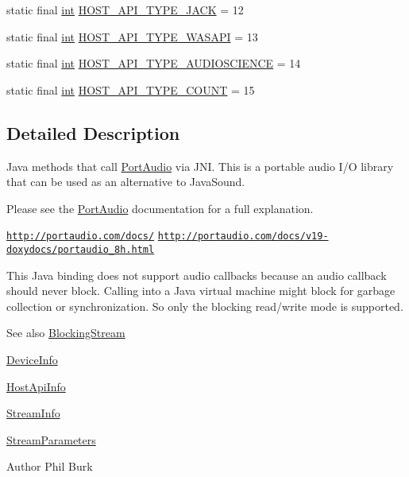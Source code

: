 \begin{DoxyCompactItemize}
\item 
static final \hyperlink{xmltok_8h_a5a0d4a5641ce434f1d23533f2b2e6653}{int} \hyperlink{classcom_1_1portaudio_1_1_port_audio_a883a151e9c2fa3df4bc2a246441dcf65}{H\+O\+S\+T\+\_\+\+A\+P\+I\+\_\+\+T\+Y\+P\+E\+\_\+\+J\+A\+CK} = 12
\item 
static final \hyperlink{xmltok_8h_a5a0d4a5641ce434f1d23533f2b2e6653}{int} \hyperlink{classcom_1_1portaudio_1_1_port_audio_a878906a801ec0974c8379defcbb1a45f}{H\+O\+S\+T\+\_\+\+A\+P\+I\+\_\+\+T\+Y\+P\+E\+\_\+\+W\+A\+S\+A\+PI} = 13
\item 
static final \hyperlink{xmltok_8h_a5a0d4a5641ce434f1d23533f2b2e6653}{int} \hyperlink{classcom_1_1portaudio_1_1_port_audio_ad72258e139b9133a8f20723e8aefa184}{H\+O\+S\+T\+\_\+\+A\+P\+I\+\_\+\+T\+Y\+P\+E\+\_\+\+A\+U\+D\+I\+O\+S\+C\+I\+E\+N\+CE} = 14
\item 
static final \hyperlink{xmltok_8h_a5a0d4a5641ce434f1d23533f2b2e6653}{int} \hyperlink{classcom_1_1portaudio_1_1_port_audio_ab2432d2945896284335ab4adcf4b9ddf}{H\+O\+S\+T\+\_\+\+A\+P\+I\+\_\+\+T\+Y\+P\+E\+\_\+\+C\+O\+U\+NT} = 15
\end{DoxyCompactItemize}


\subsection{Detailed Description}
Java methods that call \hyperlink{classcom_1_1portaudio_1_1_port_audio}{Port\+Audio} via J\+NI. This is a portable audio I/O library that can be used as an alternative to Java\+Sound.

Please see the \hyperlink{classcom_1_1portaudio_1_1_port_audio}{Port\+Audio} documentation for a full explanation.

\href{http://portaudio.com/docs/}{\tt http\+://portaudio.\+com/docs/} \href{http://portaudio.com/docs/v19-doxydocs/portaudio_8h.html}{\tt http\+://portaudio.\+com/docs/v19-\/doxydocs/portaudio\+\_\+8h.\+html}

This Java binding does not support audio callbacks because an audio callback should never block. Calling into a Java virtual machine might block for garbage collection or synchronization. So only the blocking read/write mode is supported.

\begin{DoxySeeAlso}{See also}
\hyperlink{classcom_1_1portaudio_1_1_blocking_stream}{Blocking\+Stream} 

\hyperlink{classcom_1_1portaudio_1_1_device_info}{Device\+Info} 

\hyperlink{classcom_1_1portaudio_1_1_host_api_info}{Host\+Api\+Info} 

\hyperlink{classcom_1_1portaudio_1_1_stream_info}{Stream\+Info} 

\hyperlink{classcom_1_1portaudio_1_1_stream_parameters}{Stream\+Parameters}
\end{DoxySeeAlso}
\begin{DoxyAuthor}{Author}
Phil Burk 
\end{DoxyAuthor}


